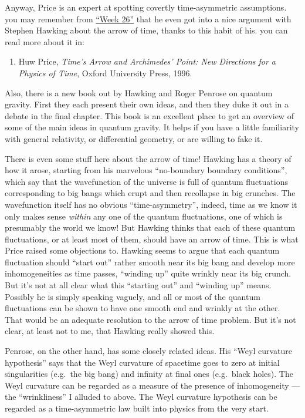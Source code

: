 \documentclass{article}
\def\tightlist{}
\begin{document}
Anyway, Price is an expert at spotting covertly time-asymmetric
assumptions. you may remember from \protect\hyperlink{week26}{``Week
26''} that he even got into a nice argument with Stephen Hawking about
the arrow of time, thanks to this habit of his. you can read more about
it in:

\begin{enumerate}
\def\labelenumi{\arabic{enumi})}
\tightlist
\item
  Huw Price, \emph{Time's Arrow and Archimedes' Point: New Directions
  for a Physics of Time}, Oxford University Press, 1996.
\end{enumerate}

Also, there is a new book out by Hawking and Roger Penrose on quantum
gravity. First they each present their own ideas, and then they duke it
out in a debate in the final chapter. This book is an excellent place to
get an overview of some of the main ideas in quantum gravity. It helps
if you have a little familiarity with general relativity, or
differential geometry, or are willing to fake it.

There is even some stuff here about the arrow of time! Hawking has a
theory of how it arose, starting from his marvelous ``no-boundary
boundary conditions'', which say that the wavefunction of the universe
is full of quantum fluctuations corresponding to big bangs which erupt
and then recollapse in big crunches. The wavefunction itself has no
obvious ``time-asymmetry'', indeed, time as we know it only makes sense
\emph{within} any one of the quantum fluctuations, one of which is
presumably the world we know! But Hawking thinks that each of these
quantum fluctuations, or at least most of them, should have an arrow of
time. This is what Price raised some objections to. Hawking seems to
argue that each quantum fluctuation should ``start out'' rather smooth
near its big bang and develop more inhomogeneities as time passes,
``winding up'' quite wrinkly near its big crunch. But it's not at all
clear what this ``starting out'' and ``winding up'' means. Possibly he
is simply speaking vaguely, and all or most of the quantum fluctuations
can be shown to have one smooth end and wrinkly at the other. That would
be an adequate resolution to the arrow of time problem. But it's not
clear, at least not to me, that Hawking really showed this.

Penrose, on the other hand, has some closely related ideas. His ``Weyl
curvature hypothesis'' says that the Weyl curvature of spacetime goes to
zero at initial singularities (e.g.~the big bang) and infinity at final
ones (e.g.~black holes). The Weyl curvature can be regarded as a measure
of the presence of inhomogeneity --- the ``wrinkliness'' I alluded to
above. The Weyl curvature hypothesis can be regarded as a
time-asymmetric law built into physics from the very start.
\end{document}
